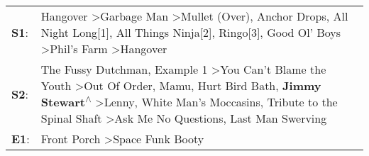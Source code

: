\begin{supertabular}{p{0.03\textwidth}p{0.92\textwidth}}
 \textbf{S1}:  &                                                                                                                                             Hangover\textsuperscript{} \textgreater \enspace Garbage Man\textsuperscript{} \textgreater \enspace Mullet (Over)\textsuperscript{}, \enspace Anchor Drops\textsuperscript{}, \enspace All Night Long[1]\textsuperscript{}, \enspace All Things Ninja[2]\textsuperscript{}, \enspace Ringo[3]\textsuperscript{}, \enspace Good Ol' Boys\textsuperscript{} \textgreater \enspace Phil's Farm\textsuperscript{} \textgreater \enspace Hangover\textsuperscript{}  \enspace  \\
 \textbf{S2}:  &  The Fussy Dutchman\textsuperscript{}, \enspace Example 1\textsuperscript{} \textgreater \enspace You Can't Blame the Youth\textsuperscript{} \textgreater \enspace Out Of Order\textsuperscript{}, \enspace Mamu\textsuperscript{}, \enspace Hurt Bird Bath\textsuperscript{}, \enspace \textbf{Jimmy Stewart\textsuperscript{$\wedge$}} \textgreater \enspace Lenny\textsuperscript{}, \enspace White Man's Moccasins\textsuperscript{}, \enspace Tribute to the Spinal Shaft\textsuperscript{} \textgreater \enspace Ask Me No Questions\textsuperscript{}, \enspace Last Man Swerving\textsuperscript{}  \enspace  \\
 \textbf{E1}:  &                                                                                                                                                                                                                                                                                                                                                                                                                                                                                                                      Front Porch\textsuperscript{} \textgreater \enspace Space Funk Booty\textsuperscript{}  \enspace  \\
\end{supertabular}
